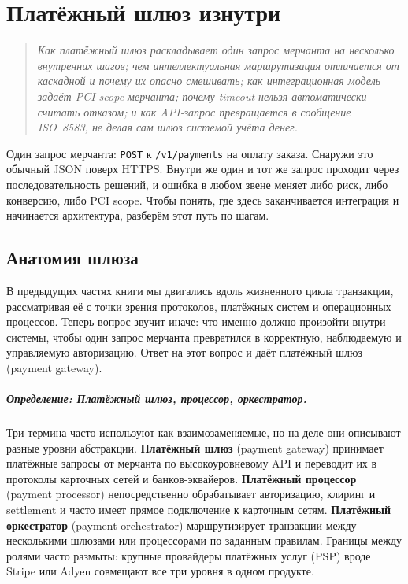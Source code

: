 
\chapter{Платёжный шлюз изнутри}
\label{ch:gateway}
\begin{quote}
  \itshape
  Как платёжный шлюз раскладывает один запрос мерчанта на несколько
  внутренних шагов; чем интеллектуальная маршрутизация отличается
  от каскадной и почему их опасно смешивать; как интеграционная
  модель задаёт PCI scope мерчанта; почему timeout нельзя
  автоматически считать отказом; и как API-запрос превращается
  в сообщение ISO~8583, не делая сам шлюз системой учёта денег.
\end{quote}

Один запрос мерчанта: \texttt{POST} к \texttt{/v1/payments}
на оплату заказа. Снаружи это обычный JSON поверх HTTPS. Внутри
же один и тот же запрос проходит через последовательность решений,
и ошибка в любом звене меняет либо риск, либо конверсию, либо
PCI scope. Чтобы понять, где здесь заканчивается интеграция
и начинается архитектура, разберём этот путь по шагам.

\section{Анатомия шлюза}
\label{sec:gw-anatomy}

В предыдущих частях книги мы двигались вдоль жизненного цикла
транзакции, рассматривая её с точки зрения протоколов, платёжных
систем и операционных процессов. Теперь вопрос звучит иначе:
что именно должно произойти внутри системы, чтобы один запрос
мерчанта превратился в корректную, наблюдаемую и управляемую
авторизацию. Ответ на этот вопрос и даёт платёжный шлюз
(payment gateway).

\paragraph{Определение: Платёжный шлюз, процессор, оркестратор.}
  Три термина часто используют как взаимозаменяемые, но на деле
  они описывают разные уровни абстракции. \textbf{Платёжный шлюз}
  (payment gateway) принимает платёжные запросы от мерчанта
  по высокоуровневому API и переводит их в протоколы карточных
  сетей и банков-эквайеров. \textbf{Платёжный процессор}
  (payment processor) непосредственно обрабатывает авторизацию,
  клиринг и settlement и часто имеет прямое подключение
  к карточным сетям. \textbf{Платёжный оркестратор}
  (payment orchestrator) маршрутизирует транзакции между
  несколькими шлюзами или процессорами по заданным правилам.
  Границы между ролями часто размыты: крупные провайдеры
  платёжных услуг (PSP) вроде Stripe или Adyen совмещают
  все три уровня в одном продукте.


